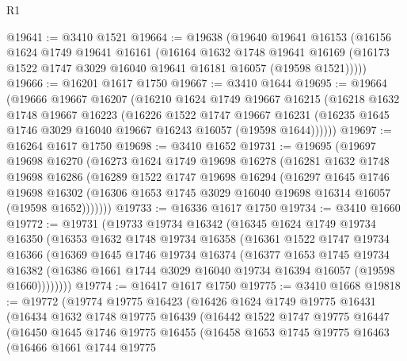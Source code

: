 \begin{lexlean}{R1}
\begin{coremodule}
@19641 := @3410 @1521
@19664 := @19638
    (@19640
      @19641
      @16153
      (@16156
        @1624
        @1749
        @19641
        @16161
        (@16164
          @1632
          @1748
          @19641
          @16169
          (@16173 @1522 @1747 @3029 @16040 @19641 @16181 @16057 (@19598 @1521)))))
@19666 := @16201 @1617 @1750
@19667 := @3410 @1644
@19695 := @19664
    (@19666
      @19667
      @16207
      (@16210
        @1624
        @1749
        @19667
        @16215
        (@16218
          @1632
          @1748
          @19667
          @16223
          (@16226
            @1522
            @1747
            @19667
            @16231
            (@16235 @1645 @1746 @3029 @16040 @19667 @16243 @16057 (@19598 @1644))))))
@19697 := @16264 @1617 @1750
@19698 := @3410 @1652
@19731 := @19695
    (@19697
      @19698
      @16270
      (@16273
        @1624
        @1749
        @19698
        @16278
        (@16281
          @1632
          @1748
          @19698
          @16286
          (@16289
            @1522
            @1747
            @19698
            @16294
            (@16297
              @1645
              @1746
              @19698
              @16302
              (@16306 @1653 @1745 @3029 @16040 @19698 @16314 @16057 (@19598 @1652)))))))
@19733 := @16336 @1617 @1750
@19734 := @3410 @1660
@19772 := @19731
    (@19733
      @19734
      @16342
      (@16345
        @1624
        @1749
        @19734
        @16350
        (@16353
          @1632
          @1748
          @19734
          @16358
          (@16361
            @1522
            @1747
            @19734
            @16366
            (@16369
              @1645
              @1746
              @19734
              @16374
              (@16377
                @1653
                @1745
                @19734
                @16382
                (@16386 @1661 @1744 @3029 @16040 @19734 @16394 @16057 (@19598 @1660))))))))
@19774 := @16417 @1617 @1750
@19775 := @3410 @1668
@19818 := @19772
    (@19774
      @19775
      @16423
      (@16426
        @1624
        @1749
        @19775
        @16431
        (@16434
          @1632
          @1748
          @19775
          @16439
          (@16442
            @1522
            @1747
            @19775
            @16447
            (@16450
              @1645
              @1746
              @19775
              @16455
              (@16458
                @1653
                @1745
                @19775
                @16463
                (@16466
                  @1661
                  @1744
                  @19775

\end{coremodule}
\end{lexlean}
